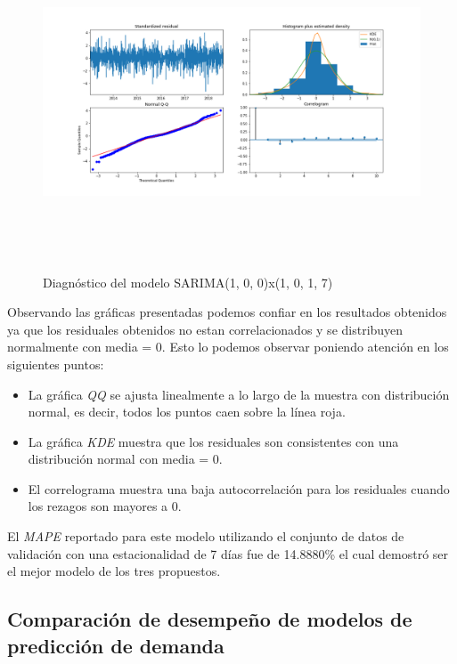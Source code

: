 \begin{figure}[H]
  \centering
      \includegraphics[width=\maxwidth,height=10cm]{figures/sarimax_summary.png}  
  \caption{Diagnóstico del modelo SARIMA(1, 0, 0)x(1, 0, 1, 7)}
\end{figure}


Observando las gráficas presentadas podemos confiar en los resultados obtenidos ya que los residuales obtenidos no estan correlacionados y se distribuyen normalmente con media = 0. Esto lo podemos observar poniendo atención en los siguientes puntos:

\begin{itemize}
  \item La gráfica \emph{QQ} se ajusta linealmente a lo largo de la muestra con distribución normal, es decir, todos los puntos caen sobre la línea roja.
  \item La gráfica \emph{KDE} muestra que los residuales son consistentes con una distribución normal con media = 0.
  \item El correlograma muestra una baja autocorrelación para los residuales cuando los rezagos son mayores a 0.
\end{itemize}

El \emph{MAPE} reportado para este modelo utilizando el conjunto de datos de validación con una estacionalidad de 7 días fue de 14.8880\% el cual demostró ser el mejor modelo de los tres propuestos.

\subsection*{Comparación de desempeño de modelos de predicción de demanda}

